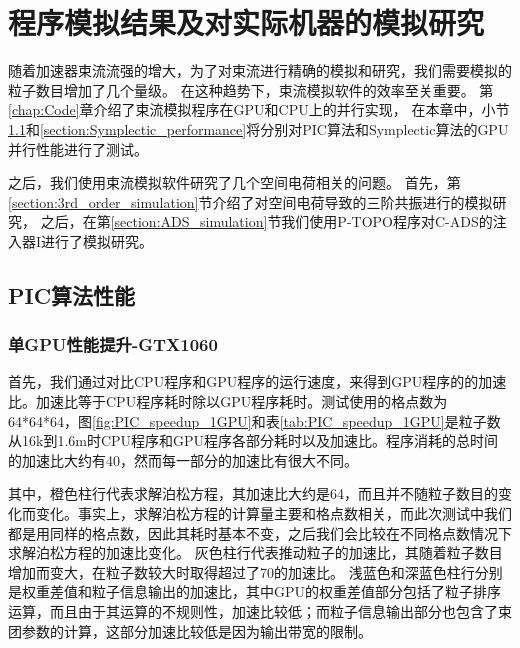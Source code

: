 \chapter{程序模拟结果及对实际机器的模拟研究} \label{chap:Simulation}
随着加速器束流流强的增大，为了对束流进行精确的模拟和研究，我们需要模拟的粒子数目增加了几个量级。
在这种趋势下，束流模拟软件的效率至关重要。
第\ref{chap:Code}章介绍了束流模拟程序在GPU和CPU上的并行实现，
在本章中，小节\ref{section:PIC_performance}和\ref{section:Symplectic_performance}将分别对PIC算法和Symplectic算法的GPU并行性能进行了测试。

之后，我们使用束流模拟软件研究了几个空间电荷相关的问题。
首先，第\ref{section:3rd_order_simulation}节介绍了对空间电荷导致的三阶共振进行的模拟研究，
之后，在第\ref{section:ADS_simulation}节我们使用P-TOPO程序对C-ADS的注入器I进行了模拟研究。

\section{PIC算法性能}             \label{section:PIC_performance}

\subsection{单GPU性能提升-GTX1060}
首先，我们通过对比CPU程序和GPU程序的运行速度，来得到GPU程序的的加速比。加速比等于CPU程序耗时除以GPU程序耗时。测试使用的格点数为~ 64*64*64，图\ref{fig:PIC_speedup_1GPU}和表\ref{tab:PIC_speedup_1GPU}是粒子数从16k到1.6m时CPU程序和GPU程序各部分耗时以及加速比。程序消耗的总时间的加速比大约有40，然而每一部分的加速比有很大不同。

其中，橙色柱行代表求解泊松方程，其加速比大约是64，而且并不随粒子数目的变化而变化。事实上，求解泊松方程的计算量主要和格点数相关，而此次测试中我们都是用同样的格点数，因此其耗时基本不变，之后我们会比较在不同格点数情况下求解泊松方程的加速比变化。
灰色柱行代表推动粒子的加速比，其随着粒子数目增加而变大，在粒子数较大时取得超过了70的加速比。
浅蓝色和深蓝色柱行分别是权重差值和粒子信息输出的加速比，其中GPU的权重差值部分包括了粒子排序运算，而且由于其运算的不规则性，加速比较低；而粒子信息输出部分也包含了束团参数的计算，这部分加速比较低是因为输出带宽的限制。


